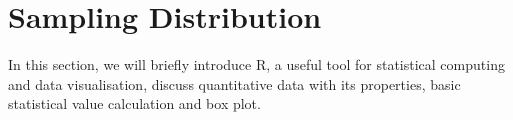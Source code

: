 \chapter{Sampling Distribution}
\label{sec.matrix}
\pagestyle{myheadings}  

In this section, we will briefly introduce R, a useful tool for statistical computing and data visualisation, discuss quantitative data with its properties, basic statistical value calculation and box plot.\\

